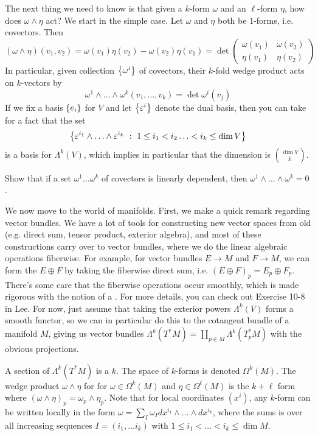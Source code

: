 The next thing we need to know is that given a $k$-form $\omega$ and
an $\ell$-form $\eta$, how does $\omega \wedge \eta$ act? We start in the simple
case. Let $\omega$ and $\eta$ both be $1$-forms, i.e. covectors. Then
$$(\omega \wedge \eta)(v_1,v_2) = \omega(v_1)\eta(v_2) - \omega(v_2)\eta(v_1)
= \det\begin{pmatrix}
  \omega(v_1) & \omega(v_2) \\
  \eta(v_1) & \eta(v_2)
\end{pmatrix}$$
In particular, given collection $\left\lbrace \omega^i \right\rbrace$ of covectors, their $k$-fold
wedge product acts on $k$-vectors by
$$\omega^1 \wedge \ldots \wedge \omega^k(v_1, \ldots ,v_k) = \det \omega^i(v_j)$$
If we fix a basis $\left\lbrace e_i \right\rbrace$ for $V$ and let $\left\lbrace \varepsilon^i \right\rbrace$ denote the
dual basis, then you can take for a fact that the set
$$\left\lbrace \varepsilon^{i_1} \wedge \ldots \wedge \varepsilon^{i_k}~:~
1 \leq i_1 < i_2 \ldots < i_k \leq \dim V \right\rbrace $$
is a basis for $\Lambda^k(V)$, which implies in particular that the dimension is
$\binom{\dim V}{k}$.
%
\begin{exer}
Show that if a set $\omega^1 \ldots \omega^k$ of covectors is linearly dependent,
then $\omega^1 \wedge \ldots \wedge \omega^k = 0$.
\end{exer}
%
We now move to the world of manifolds. First, we make a quick remark regarding
vector bundles. We have a lot of tools for constructing new vector spaces from
old (e.g. direct sum, tensor product, exterior algebra), and most of these
constructions carry over to vector bundles, where we do the linear algebraic
operations fiberwise. For example, for vector bundles $E \to M$ and $F \to M$,
we can form the  $E \oplus F$ by taking the fiberwise direct sum,
i.e. $(E \oplus F)_p = E_p \oplus F_p$. There's some care that the fiberwise
operations occur smoothly, which is made rigorous with the notion of a
. For more details, you can check out Exercise 10-8 in Lee.
For now, just assume that taking the exterior powers $\Lambda^k(V)$ forms
a smooth functor, so we can in particular do this to the cotangent bundle
of a manifold $M$, giving us vector bundles
$\Lambda^k(T^*M) = \coprod_{p \in M} \Lambda^k(T^*_pM)$ with the obvious
projections.
%
\begin{defn}
A section of $\Lambda^k(T^*M)$ is a  $k$. The space
of $k$-forms is denoted $\Omega^k(M)$. The wedge product $\omega \wedge \eta$
for for $\omega \in \Omega^k(M)$ and $\eta \in \Omega^\ell(M)$ is the $k+\ell$
form where $(\omega \wedge \eta)_p = \omega_p \wedge \eta_p$. Note that for local
coordinates $(x^i)$, any $k$-form can be written locally in the form
$\omega = \sum_I \omega_I dx^{i_1} \wedge \ldots \wedge dx^{i_k}$, where the
sums is over all increasing sequences $I = (i_1, \ldots i_k)$ with
$1 \leq i_1 < \ldots < i_k \leq \dim M$.
\end{defn}
